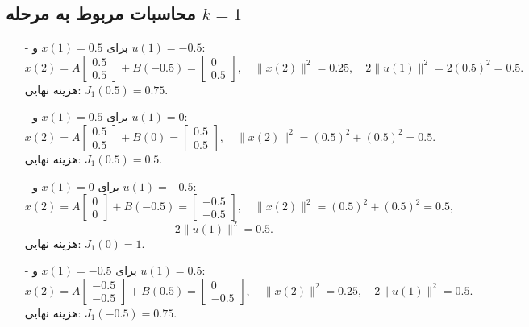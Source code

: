 	\subsection*{محاسبات مربوط به مرحله \( k = 1 \)}
\begin{itemize}
	\item[-] برای \( x(1) = 0.5 \) و \( u(1) = -0.5 \):
	\[
	x(2) = A \begin{bmatrix} 0.5 \\ 0.5 \end{bmatrix} + B(-0.5) = \begin{bmatrix} 0 \\ 0.5 \end{bmatrix}, \quad \|x(2)\|^2 = 0.25, \quad 2\|u(1)\|^2 = 2(0.5)^2 = 0.5.
	\]
	هزینه نهایی: \( J_1(0.5) = 0.75 \).\\
	
	\item[-] برای \( x(1) = 0.5 \) و \( u(1) = 0 \):
	\[
	x(2) = A \begin{bmatrix} 0.5 \\ 0.5 \end{bmatrix} + B(0) = \begin{bmatrix} 0.5 \\ 0.5 \end{bmatrix}, \quad \|x(2)\|^2 = (0.5)^2 + (0.5)^2 = 0.5.
	\]
	هزینه نهایی: \( J_1(0.5) = 0.5 \).\\
	
	\item[-] برای \( x(1) = 0 \) و \( u(1) = -0.5 \):
	\[
	x(2) = A \begin{bmatrix} 0 \\ 0 \end{bmatrix} + B(-0.5) = \begin{bmatrix} -0.5 \\ -0.5 \end{bmatrix}, \quad \|x(2)\|^2 = (0.5)^2 + (0.5)^2 = 0.5, 
	\]
	\[
	\quad 2\|u(1)\|^2 = 0.5.
	\]
	هزینه نهایی: \( J_1(0) = 1 \).\\
	
	
	
	
	\item[-] برای \( x(1) = -0.5 \) و \( u(1) = 0.5 \):
	\[
	x(2) = A \begin{bmatrix} -0.5 \\ -0.5 \end{bmatrix} + B(0.5) = \begin{bmatrix} 0 \\ -0.5 \end{bmatrix}, \quad \|x(2)\|^2 = 0.25, \quad 2\|u(1)\|^2 = 0.5.
	\]
	هزینه نهایی: \( J_1(-0.5) = 0.75 \).
\end{itemize}
